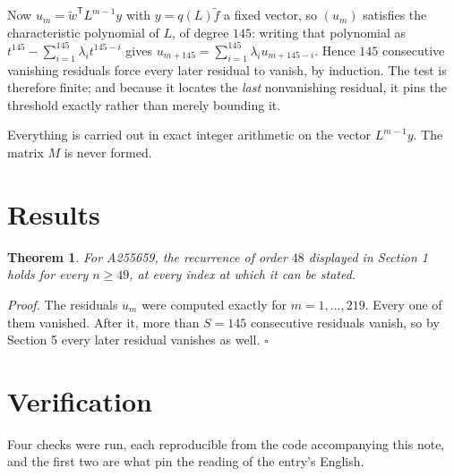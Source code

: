 \documentclass[11pt]{article}
\newtheorem{theorem}{Theorem}
\theoremstyle{definition}
\begin{document}
Now $u_m = \tilde w^{\mathsf T} L^{m-1} y$ with $y = q(L)\tilde f$ a fixed vector, so $(u_m)$ satisfies the characteristic polynomial of $L$, of degree $145$: writing that polynomial as $t^{145} - \sum_{i=1}^{145} \lambda_i t^{145-i}$ gives $u_{m+145} = \sum_{i=1}^{145} \lambda_i u_{m+145-i}$. Hence $145$ consecutive vanishing residuals force every later residual to vanish, by induction. The test is therefore finite; and because it locates the {\itshape last} nonvanishing residual, it pins the threshold exactly rather than merely bounding it.

Everything is carried out in exact integer arithmetic on the vector $L^{m-1}y$. The matrix $M$ is never formed.

\section{Results}

\begin{theorem} For A255659, the recurrence of order $48$ displayed in Section 1 holds for every $n \ge 49$, at every index at which it can be stated.\end{theorem}

{\itshape Proof.} The residuals $u_m$ were computed exactly for $m = 1,\dots,219$. Every one of them vanished. After it, more than $S = 145$ consecutive residuals vanish, so by Section 5 every later residual vanishes as well. $\square$

\section{Verification}

Four checks were run, each reproducible from the code accompanying this note, and the first two are what pin the reading of the entry's English.
\end{document}
